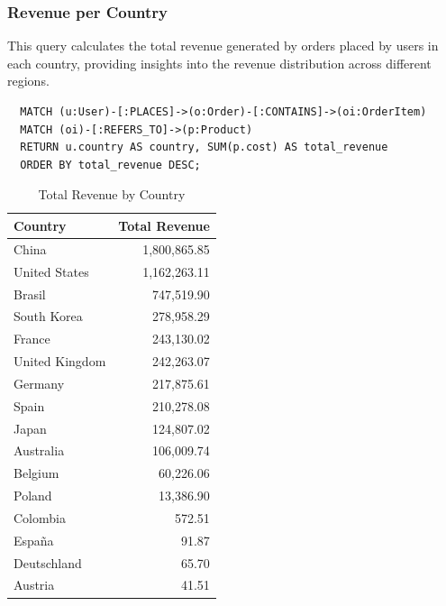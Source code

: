 \documentclass[a4paper,12pt]{article}
\begin{document}
\subsubsection{Revenue per Country}
This query calculates the total revenue generated by orders placed by users in each country, providing insights into the revenue distribution across different regions.
\begin{verbatim}
  MATCH (u:User)-[:PLACES]->(o:Order)-[:CONTAINS]->(oi:OrderItem)
  MATCH (oi)-[:REFERS_TO]->(p:Product)
  RETURN u.country AS country, SUM(p.cost) AS total_revenue
  ORDER BY total_revenue DESC;
\end{verbatim}
\begin{table}[h!]
  \centering
  \caption{Total Revenue by Country}
  \label{tab:total_revenue}
  \begin{tabular}{l r}
      \toprule
      \textbf{Country} & \textbf{Total Revenue} \\
      \midrule
      China           & 1,800,865.85 \\
      United States   & 1,162,263.11 \\
      Brasil          & 747,519.90 \\
      South Korea     & 278,958.29 \\
      France          & 243,130.02 \\
      United Kingdom  & 242,263.07 \\
      Germany         & 217,875.61 \\
      Spain           & 210,278.08 \\
      Japan           & 124,807.02 \\
      Australia       & 106,009.74 \\
      Belgium         & 60,226.06 \\
      Poland          & 13,386.90 \\
      Colombia        & 572.51 \\
      España          & 91.87 \\
      Deutschland     & 65.70 \\
      Austria         & 41.51 \\
      \bottomrule
  \end{tabular}
\end{table}
\end{document}
